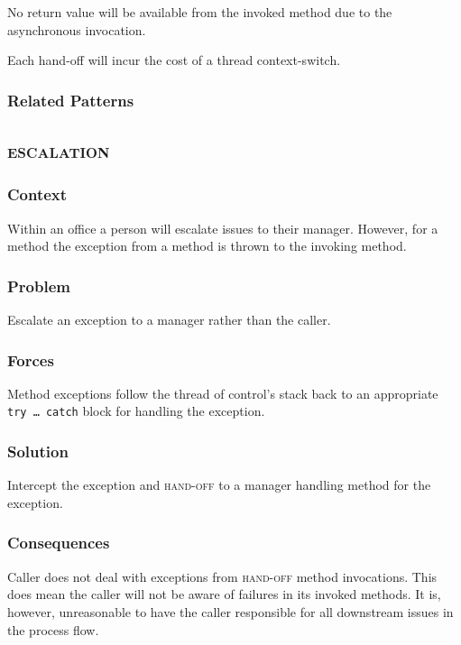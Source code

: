 \documentclass[prodmode]{style/acmlarge}
\begin{document}
No return value will be available from the invoked method due to the
asynchronous invocation.

Each hand-off will incur the cost of a thread context-switch.

\subsubsection*{Related Patterns}



\subsection{\textsc{\textbf{escalation}}}

\subsubsection*{Context} Within an office a person will escalate issues to their
manager.  However, for a method the exception from a method is thrown to the
invoking method.

\subsubsection*{Problem} Escalate an exception to a manager rather than the caller.

\subsubsection*{Forces} Method exceptions follow the thread of control's stack
back to an appropriate \texttt{try~\ldots~catch} block for handling the
exception.

\subsubsection*{Solution} Intercept the exception and \textsc{hand-off} to a
manager handling method for the exception.

\subsubsection*{Consequences} Caller does not deal with exceptions from
\textsc{hand-off} method invocations.  This does mean the caller will not be
aware of failures in its invoked methods.  It is, however, unreasonable to have
the caller responsible for all downstream issues in the process flow.
\end{document}
